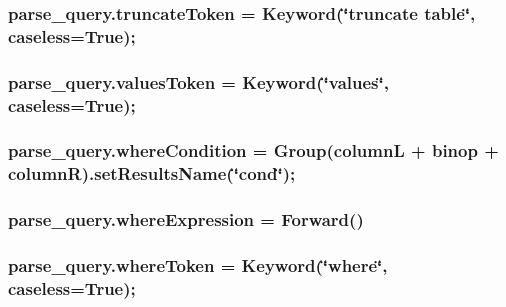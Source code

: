 \subsubsection[{\texorpdfstring{truncate\+Token}{truncateToken}}]{\setlength{\rightskip}{0pt plus 5cm}parse\+\_\+query.\+truncate\+Token = Keyword(\char`\"{}truncate {\bf table}\char`\"{}, caseless=True);}\hypertarget{namespaceparse__query_ae8bbedcc418797a022f1729c3ab06d8f}{}\label{namespaceparse__query_ae8bbedcc418797a022f1729c3ab06d8f}
\subsubsection[{\texorpdfstring{values\+Token}{valuesToken}}]{\setlength{\rightskip}{0pt plus 5cm}parse\+\_\+query.\+values\+Token = Keyword(\char`\"{}values\char`\"{}, caseless=True);}\hypertarget{namespaceparse__query_a23075b5f9c87912458ebe512e6c84d64}{}\label{namespaceparse__query_a23075b5f9c87912458ebe512e6c84d64}
\subsubsection[{\texorpdfstring{where\+Condition}{whereCondition}}]{\setlength{\rightskip}{0pt plus 5cm}parse\+\_\+query.\+where\+Condition = Group({\bf columnL} + {\bf binop} + columnR).set\+Results\+Name(\char`\"{}cond\char`\"{});}\hypertarget{namespaceparse__query_aa5e265b3dd4230a09df4977a3e3db604}{}\label{namespaceparse__query_aa5e265b3dd4230a09df4977a3e3db604}
\subsubsection[{\texorpdfstring{where\+Expression}{whereExpression}}]{\setlength{\rightskip}{0pt plus 5cm}parse\+\_\+query.\+where\+Expression = Forward()}\hypertarget{namespaceparse__query_af769fe5bdda44bd71ae1e252d7b7bba5}{}\label{namespaceparse__query_af769fe5bdda44bd71ae1e252d7b7bba5}
\subsubsection[{\texorpdfstring{where\+Token}{whereToken}}]{\setlength{\rightskip}{0pt plus 5cm}parse\+\_\+query.\+where\+Token = Keyword(\char`\"{}where\char`\"{}, caseless=True);}\hypertarget{namespaceparse__query_a4b0f83d40d9f19424aab72cfca82eeba}{}\label{namespaceparse__query_a4b0f83d40d9f19424aab72cfca82eeba}
